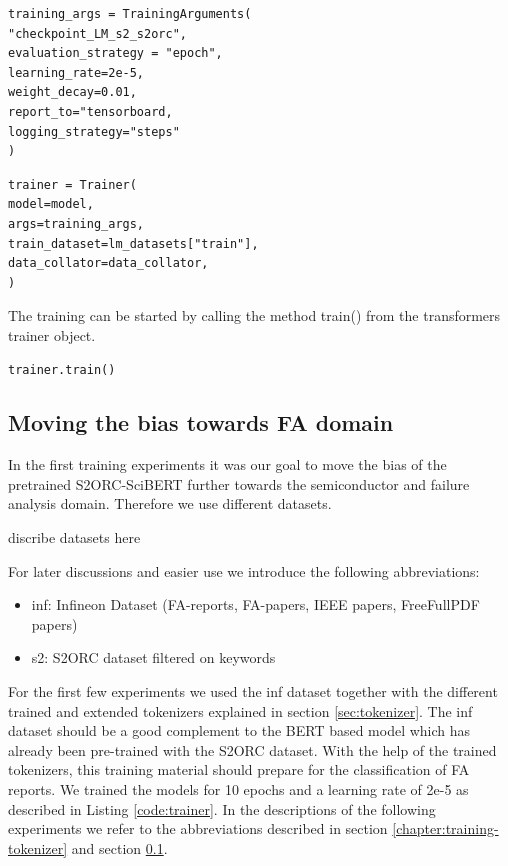 \begin{code}
	\label{code:train_args}
\begin{verbatim}
training_args = TrainingArguments(
"checkpoint_LM_s2_s2orc",
evaluation_strategy = "epoch",
learning_rate=2e-5,
weight_decay=0.01,
report_to="tensorboard,
logging_strategy="steps"
)
\end{verbatim}
\end{code}

\begin{code}
	\label{code:trainer}
\begin{verbatim}
trainer = Trainer(
model=model,
args=training_args,
train_dataset=lm_datasets["train"],
data_collator=data_collator,
)
\end{verbatim}
\end{code}

The training can be started by calling the method train() from the \alert{transformers trainer object.}
\begin{code}
	\label{code:train}
\begin{verbatim}
trainer.train()
\end{verbatim}
\end{code}

\subsection{Moving the bias towards FA domain}\label{chapter:training-experiments}
In the first training experiments it was our goal to move the bias of the pretrained S2ORC-SciBERT further towards the semiconductor and failure analysis domain. Therefore we use different datasets. 

\alert{discribe datasets here}

For later discussions and easier use we introduce the following abbreviations:
\begin{itemize}
	\item inf: Infineon Dataset (FA-reports, FA-papers, IEEE papers, FreeFullPDF papers)
	\item s2: S2ORC dataset filtered on keywords
\end{itemize}

For the first few experiments we used the inf dataset together with the different trained and extended tokenizers explained in section \ref{sec:tokenizer}. The inf dataset should be a good complement to the BERT based model which has already been pre-trained with the S2ORC dataset. With the help of the trained tokenizers, this training material should prepare for the classification of FA reports. We trained the models for 10 epochs and a learning rate of 2e-5 as described in Listing \ref{code:trainer}. In the descriptions of the following experiments we refer to the abbreviations described in section \ref{chapter:training-tokenizer} and section \ref{chapter:training-experiments}. \newline


